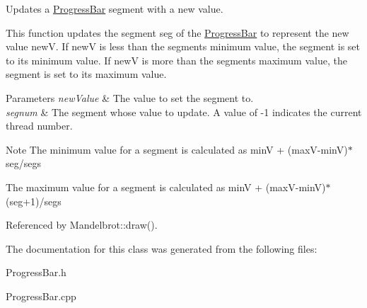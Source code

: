 Updates a \hyperlink{classtsgl_1_1_progress_bar}{Progress\+Bar} segment with a new value. 

This function updates the segment {\ttfamily seg} of the \hyperlink{classtsgl_1_1_progress_bar}{Progress\+Bar} to represent the new value {\ttfamily newV}. If newV is less than the segment\textquotesingle{}s minimum value, the segment is set to its minimum value. If newV is more than the segment\textquotesingle{}s maximum value, the segment is set to its maximum value. 
\begin{DoxyParams}{Parameters}
{\em new\+Value} & The value to set the segment to. \\
\hline
{\em segnum} & The segment whose value to update. A value of -\/1 indicates the current thread number. \\
\hline
\end{DoxyParams}
\begin{DoxyNote}{Note}
The minimum value for a segment is calculated as {\ttfamily minV + (max\+V-\/minV)$\ast$seg/segs} 

The maximum value for a segment is calculated as {\ttfamily minV + (max\+V-\/minV)$\ast$(seg+1)/segs} 
\end{DoxyNote}


Referenced by Mandelbrot\+::draw().



The documentation for this class was generated from the following files\+:\begin{DoxyCompactItemize}
\item 
Progress\+Bar.\+h\item 
Progress\+Bar.\+cpp\end{DoxyCompactItemize}
